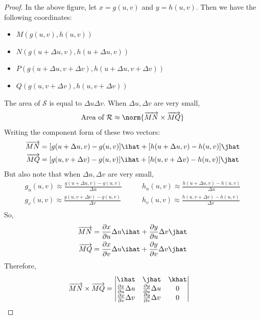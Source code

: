 \documentclass[12pt]{article}
\begin{document}
\begin{proof}
In the above figure, let $x = g(u,v)$ and $y=h(u,v)$. Then we have the following coordinates:
\begin{itemize}
\item $M(g(u,v),h(u,v))$
\item $N(g(u+\Delta u,v),h(u+\Delta u,v))$
\item $P(g(u+\Delta u,v+\Delta v),h(u+\Delta u,v+\Delta v))$
\item $Q(g(u,v+\Delta v),h(u,v+\Delta v))$
\end{itemize}
The area of $\mathcal{S}$ is equal to $\Delta u\Delta v$. When $\Delta u, \Delta v$ are very small, \[ \text{Area of } \mathcal{R} \approx \norm{\overrightarrow{MN} \times \overrightarrow{MQ}} \]
Writing the component form of these two vectors: 
\[
\begin{aligned}
\overrightarrow{MN} &= [g(u+\Delta u,v) - g(u,v)]\ihat + [h(u+\Delta u,v) - h(u,v)]\jhat \\
\overrightarrow{MQ} &= [g(u,v+\Delta v) - g(u,v)]\ihat + [h(u,v+\Delta v) - h(u,v)]\jhat \\
\end{aligned}
\]
But also note that when $\Delta u,\Delta v$ are very small,
\[
\begin{aligned}
g_u(u,v) \approx \frac{g(u+\Delta u,v) - g(u,v)}{\Delta u} &\qquad h_u(u,v) \approx \frac{h(u+\Delta u,v) - h(u,v)}{\Delta u} \\
g_v(u,v) \approx \frac{g(u,v+\Delta v) - g(u,v)}{\Delta v} &\qquad h_v(u,v) \approx \frac{h(u,v+\Delta v) - h(u,v)}{\Delta v} \\
\end{aligned}
\]
So,
\[
\begin{aligned}
\overrightarrow{MN} &= \frac{\partial x}{\partial u}\Delta u \ihat + \frac{\partial y}{\partial u}\Delta v \jhat \\
\overrightarrow{MQ} &= \frac{\partial x}{\partial v}\Delta u \ihat + \frac{\partial y}{\partial v}\Delta v \jhat \\
\end{aligned}
\]
Therefore,
\[
\begin{aligned}
\overrightarrow{MN} \times \overrightarrow{MQ} &=
\begin{vmatrix}
\ihat & \jhat & \khat \\
\frac{\partial x}{\partial u}\Delta u & \frac{\partial y}{\partial u}\Delta u & 0 \\
\frac{\partial x}{\partial v}\Delta v & \frac{\partial y}{\partial v}\Delta v & 0 
\end{vmatrix}

\end{aligned}\]
\end{proof}
\end{document}
